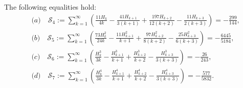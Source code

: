\documentclass[10pt,a4paper]{amsart}
\begin{document}
\begin{lemma} \label{TelescopingLemma}
The following equalities hold:
\begin{align*}
    &\textit{(a)}\quad \mathcal{S}_4 := \sum_{k=1}^\infty \left(\frac{11 H_k}{4 k} -\frac{41 H_{k+1}}{3 (k+1)} + \frac{197 H_{k+2}}{12 (k+2)} - \frac{11 H_{k+3}}{2 (k+3)}\right) = -\frac{299}{144},\\
    &\textit{(b)}\quad \mathcal{S}_5 := \sum_{k=1}^\infty \left(\frac{73 H_k^2}{24 k} - \frac{11 H_{k+1}^2}{k+1} +\frac{97 H_{k+2}^2}{8 (k+2)} - \frac{25 H_{k+3}^2}{6 (k+3)}\right) = -\frac{6445}{5184},\\
    &\textit{(c)}\quad \mathcal{S}_6 := \sum_{k=1}^\infty \left(\frac{H_k^3}{3 k} - \frac{H_{k+1}^3}{k+1} + \frac{H_{k+2}^3}{k+2} -\frac{H_{k+3}^3}{3 (k+3)}\right) = -\frac{26}{243},\\
    &\textit{(d)}\quad \mathcal{S}_7 := \sum_{k=1}^\infty \left(\frac{H_k^4}{3 k} - \frac{H_{k+1}^4}{k+1} + \frac{H_{k+2}^4}{k+2} - \frac{H_{k+3}^4}{3 (k+3)}\right) = -\frac{577}{5832}.
\end{align*}
\end{lemma}
\end{document}
